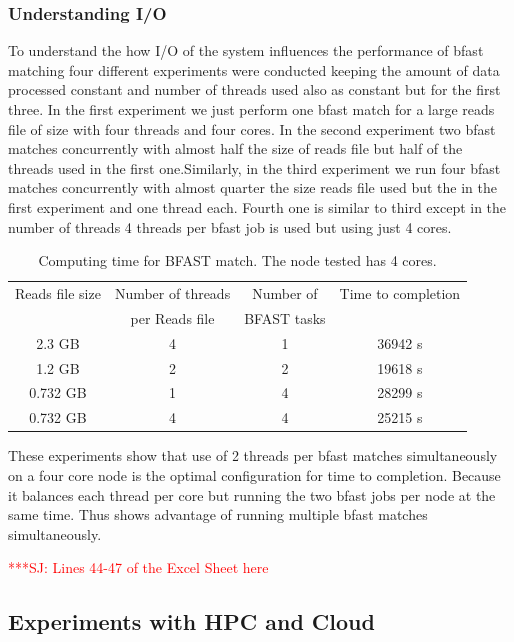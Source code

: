 \documentclass[12pt]{article}
\newcommand{\jhanote}[1]{ {\textcolor{red}     {***SJ: #1}}}
\newcommand{\jhanote}[1]{}
\begin{document}
\subsubsection{Understanding I/O}
{
To understand the how I/O of the system influences the performance of bfast matching four different experiments were conducted keeping the amount of data processed constant and number of threads used also as constant but for the first three. In the first experiment we just perform one bfast match for a large reads file of size with four threads and four cores. In the second experiment two bfast matches concurrently with almost half the size of reads file but half of the threads used in the first one.Similarly, in the third experiment we run four bfast matches concurrently with almost quarter the size reads file used but the in the first experiment and one thread each. Fourth one is similar to third except in the number of threads 4 threads per bfast job is used but using just 4 cores.

 \begin{table}
 \begin{tabular}{|c|c|c|c|} 
 \hline 
Reads file size &  Number of threads  & Number of  & Time to completion \\
& per Reads file&  BFAST tasks & \\  \hline
2.3 GB &  4 & 1 & 36942 s \\
1.2 GB & 2 & 2 & 19618 s \\
0.732 GB & 1 & 4 & 28299 s\\ 
0.732  GB & 4 & 4 & 25215 s\\

 \hline
 \end{tabular}
 \label{table:understand I/o} 
 \caption{Computing time for BFAST match.  The node tested has 4 cores.}
\end{table}

These experiments show that use of 2 threads per bfast matches simultaneously on a four core node is the optimal configuration for time to completion. Because it balances each thread per core but  running the two bfast jobs per node at the same time. Thus shows advantage of running multiple bfast matches simultaneously. 


}

\jhanote{Lines 44-47 of the Excel Sheet here}

\subsection{Experiments with HPC and Cloud}
\end{document}
